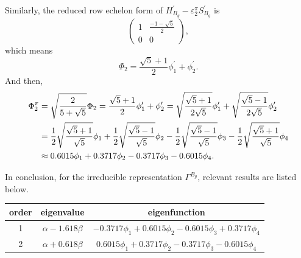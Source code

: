 \documentclass[a4paper]{book}
\newcommand{\Hp}{H^\prime}
\newcommand{\Sp}{S^\prime}
\begin{document}
\begin{solution}
\begin{enumerate}[label=(\alph*)]
		Similarly, the reduced row echelon form of $\Hp_{B_g}-\varepsilon^\pi_2 \Sp_{B_g}$ is
		\begin{equation*}
			\begin{pmatrix}
				1	& \frac{-1-\sqrt{5}}{2}	\\	0	&	0
			\end{pmatrix},
		\end{equation*}		
		which means
		\begin{equation*}
			\Phi_2 = \frac{\sqrt{5}+1}{2}\phi^\prime_1 + \phi^\prime_2.
		\end{equation*}
		And then,
		\begin{align}
			\Phi^\pi_2 &= \sqrt{ \frac{2}{5+\sqrt{5}} } \Phi_2 = \frac{\sqrt{5}+1}{2}\phi^\prime_1 + \phi^\prime_2 = \sqrt{\frac{\sqrt{5}+1}{2\sqrt{5}}} \phi^\prime_1 + \sqrt{\frac{\sqrt{5}-1}{2\sqrt{5}}} \phi^\prime_2	\notag \\
			&= \frac{1}{2}\sqrt{\frac{\sqrt{5}+1}{\sqrt{5}}}\phi_1  + \frac{1}{2}\sqrt{\frac{\sqrt{5}-1}{\sqrt{5}}} \phi_2 - \frac{1}{2}\sqrt{\frac{\sqrt{5}-1}{\sqrt{5}}} \phi_3 - \frac{1}{2}\sqrt{\frac{\sqrt{5}+1}{\sqrt{5}}} \phi_4 \notag \\
			&\approx 0.6015\phi_1 + 0.3717 \phi_2 - 0.3717 \phi_3 -  0.6015\phi_4.
		\end{align}
		
		In conclusion, for the irreducible representation $\Gamma^{B_g}$, relevant results are listed below.
		
		\begin{center}
		\setlength{\abovecaptionskip}{-0.5em}
		\begin{tabular}{ccc}\hline
		  order	&	eigenvalue		& 	eigenfunction	\\ \hline
			1	&$\alpha-1.618\beta$& 	$-0.3717 \phi_1 + 0.6015 \phi_2 - 0.6015 \phi_3 + 0.3717 \phi_4$ \\
			2	&$\alpha+0.618\beta$& 	$0.6015\phi_1 + 0.3717 \phi_2 - 0.3717 \phi_3 -  0.6015\phi_4$\\ \hline
		\end{tabular}
		\end{center}
		

\end{enumerate}
\end{solution}
\end{document}
